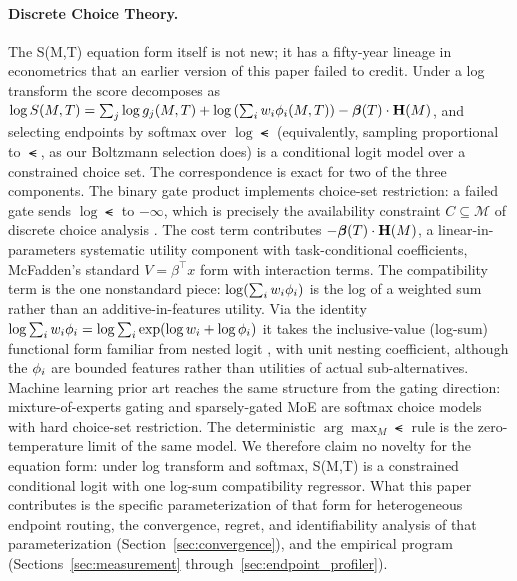 \paragraph{Discrete Choice Theory.}
The S(M,T) equation form itself is not new; it has a fifty-year lineage in econometrics that an earlier version of this paper failed to credit. Under a log transform the score decomposes as $\log S(M,T) = \sum_j \log g_j(M,T) + \log\left(\sum_i w_i \phi_i(M,T)\right) - \boldsymbol{\beta}(T) \cdot \mathbf{H}(M)$, and selecting endpoints by softmax over $\log \smt$ (equivalently, sampling proportional to $\smt$, as our Boltzmann selection does) is a conditional logit model \citep{mcfadden1974conditional} over a constrained choice set. The correspondence is exact for two of the three components. The binary gate product implements choice-set restriction: a failed gate sends $\log \smt$ to $-\infty$, which is precisely the availability constraint $C \subseteq \mathcal{M}$ of discrete choice analysis \citep{mcfadden1974conditional, train2009discrete}. The cost term contributes $-\boldsymbol{\beta}(T) \cdot \mathbf{H}(M)$, a linear-in-parameters systematic utility component with task-conditional coefficients, McFadden's standard $V = \beta^\top x$ form with interaction terms. The compatibility term is the one nonstandard piece: $\log(\sum_i w_i \phi_i)$ is the log of a weighted sum rather than an additive-in-features utility. Via the identity $\log \sum_i w_i \phi_i = \log \sum_i \exp(\log w_i + \log \phi_i)$ it takes the inclusive-value (log-sum) functional form familiar from nested logit \citep{train2009discrete}, with unit nesting coefficient, although the $\phi_i$ are bounded features rather than utilities of actual sub-alternatives. Machine learning prior art reaches the same structure from the gating direction: mixture-of-experts gating \citep{jacobs1991adaptive} and sparsely-gated MoE \citep{shazeer2017outrageously} are softmax choice models with hard choice-set restriction. The deterministic $\arg\max_M \smt$ rule is the zero-temperature limit of the same model. We therefore claim no novelty for the equation form: under log transform and softmax, S(M,T) is a constrained conditional logit with one log-sum compatibility regressor. What this paper contributes is the specific parameterization of that form for heterogeneous endpoint routing, the convergence, regret, and identifiability analysis of that parameterization (Section~\ref{sec:convergence}), and the empirical program (Sections~\ref{sec:measurement} through~\ref{sec:endpoint_profiler}).

